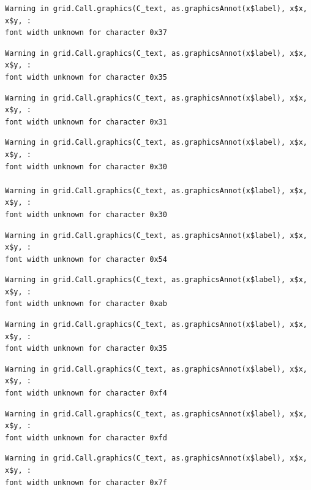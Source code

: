 \documentclass[
  letterpaper,
  DIV=11,
  numbers=noendperiod]{scrreprt}
\begin{document}
\begin{verbatim}
Warning in grid.Call.graphics(C_text, as.graphicsAnnot(x$label), x$x, x$y, :
font width unknown for character 0x37
\end{verbatim}

\begin{verbatim}
Warning in grid.Call.graphics(C_text, as.graphicsAnnot(x$label), x$x, x$y, :
font width unknown for character 0x35
\end{verbatim}

\begin{verbatim}
Warning in grid.Call.graphics(C_text, as.graphicsAnnot(x$label), x$x, x$y, :
font width unknown for character 0x31
\end{verbatim}

\begin{verbatim}
Warning in grid.Call.graphics(C_text, as.graphicsAnnot(x$label), x$x, x$y, :
font width unknown for character 0x30

Warning in grid.Call.graphics(C_text, as.graphicsAnnot(x$label), x$x, x$y, :
font width unknown for character 0x30
\end{verbatim}

\begin{verbatim}
Warning in grid.Call.graphics(C_text, as.graphicsAnnot(x$label), x$x, x$y, :
font width unknown for character 0x54
\end{verbatim}

\begin{verbatim}
Warning in grid.Call.graphics(C_text, as.graphicsAnnot(x$label), x$x, x$y, :
font width unknown for character 0xab
\end{verbatim}

\begin{verbatim}
Warning in grid.Call.graphics(C_text, as.graphicsAnnot(x$label), x$x, x$y, :
font width unknown for character 0x35
\end{verbatim}

\begin{verbatim}
Warning in grid.Call.graphics(C_text, as.graphicsAnnot(x$label), x$x, x$y, :
font width unknown for character 0xf4
\end{verbatim}

\begin{verbatim}
Warning in grid.Call.graphics(C_text, as.graphicsAnnot(x$label), x$x, x$y, :
font width unknown for character 0xfd
\end{verbatim}

\begin{verbatim}
Warning in grid.Call.graphics(C_text, as.graphicsAnnot(x$label), x$x, x$y, :
font width unknown for character 0x7f
\end{verbatim}
\end{document}
